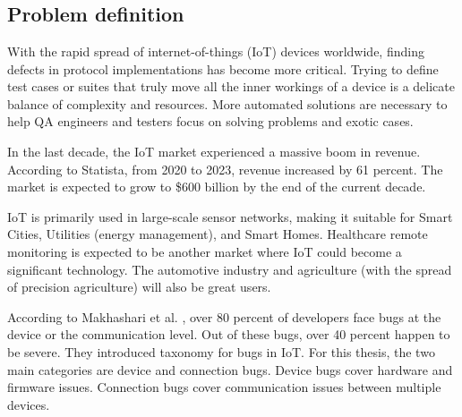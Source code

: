 \chapter{\bevezetes}
\label{chap:intro}



\section{Problem definition}

With the rapid spread of internet-of-things (IoT) devices worldwide, finding defects in protocol implementations has become more critical. Trying to define test cases or suites that truly move all the inner workings of a device is a delicate balance of complexity and resources. More automated solutions are necessary to help QA engineers and testers focus on solving problems and exotic cases.

In the last decade, the IoT market experienced a massive boom in revenue. According to Statista\cite{statista:revenue:2023}, from 2020 to 2023, revenue increased by 61 percent. The market is expected to grow to \$600 billion by the end of the current decade.

IoT is primarily used in large-scale sensor networks, making it suitable for Smart Cities, Utilities (energy management), and Smart Homes\cite{9210375}. Healthcare remote monitoring is expected to be another market where IoT could become a significant technology. The automotive industry and agriculture\cite{8883163, 9681084} (with the spread of precision agriculture) will also be great users.

According to Makhashari et al. \cite{9402092}, over 80 percent of developers face bugs at the device or the communication level. Out of these bugs, over 40 percent happen to be severe. They introduced taxonomy for bugs in IoT. For this thesis, the two main categories are device and connection bugs. Device bugs cover hardware and firmware issues. Connection bugs cover communication issues between multiple devices.

